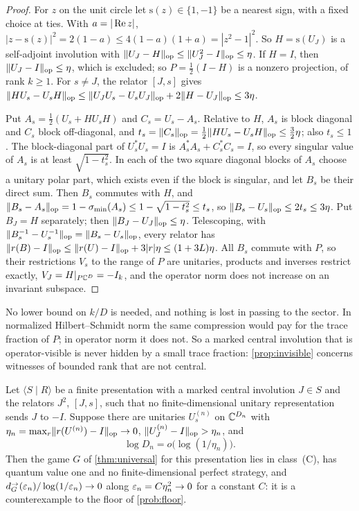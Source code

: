 \begin{proof}
For $z$ on the unit circle let $\mathrm s(z)\in\{1,-1\}$ be a nearest sign, with a fixed choice at ties. With $a=|\operatorname{Re} z|$,
$|z-\mathrm s(z)|^2=2(1-a)\le4(1-a)(1+a)=|z^2-1|^2$. So $H=\mathrm s(U_J)$ is a self-adjoint involution with
$\lVert U_J-H\rVert_{\mathrm{op}}\le\lVert U_J^2-I\rVert_{\mathrm{op}}\le\eta$. If $H=I$, then $\lVert U_J-I\rVert_{\mathrm{op}}\le\eta$, which is excluded; so $P=\frac12(I-H)$ is a nonzero
projection, of rank $k\ge1$. For $s\ne J$, the relator $[J,s]$ gives
$\lVert HU_s-U_sH\rVert_{\mathrm{op}}\le\lVert U_JU_s-U_sU_J\rVert_{\mathrm{op}}+2\lVert H-U_J\rVert_{\mathrm{op}}\le3\eta$.

Put $A_s=\frac12(U_s+HU_sH)$ and $C_s=U_s-A_s$. Relative to $H$, $A_s$ is block diagonal and $C_s$ block off-diagonal, and
$t_s=\lVert C_s\rVert_{\mathrm{op}}=\frac12\lVert HU_s-U_sH\rVert_{\mathrm{op}}\le\frac32\eta$; also $t_s\le1$. The block-diagonal part of $U_s^*U_s=I$ is
$A_s^*A_s+C_s^*C_s=I$, so every singular value of $A_s$ is at least $\sqrt{1-t_s^2}$. In each of the two square diagonal blocks of $A_s$
choose a unitary polar part, which exists even if the block is singular, and let $B_s$ be their direct sum. Then $B_s$ commutes
with $H$, and $\lVert B_s-A_s\rVert_{\mathrm{op}}=1-\sigma_{\min}(A_s)\le1-\sqrt{1-t_s^2}\le t_s$, so $\lVert B_s-U_s\rVert_{\mathrm{op}}\le2t_s\le3\eta$. Put $B_J=H$ separately; then
$\lVert B_J-U_J\rVert_{\mathrm{op}}\le\eta$. Telescoping, with $\lVert B_s^{-1}-U_s^{-1}\rVert_{\mathrm{op}}=\lVert B_s-U_s\rVert_{\mathrm{op}}$, every relator has
$\lVert r(B)-I\rVert_{\mathrm{op}}\le\lVert r(U)-I\rVert_{\mathrm{op}}+3|r|\eta\le(1+3L)\eta$. All $B_s$ commute with $P$, so their restrictions $V_s$ to the range of $P$ are
unitaries, products and inverses restrict exactly, $V_J=H|_{P\mathbb C^D}=-I_k$, and the operator norm does not increase on an invariant
subspace.
\end{proof}

No lower bound on $k/D$ is needed, and nothing is lost in passing to the sector. In normalized Hilbert--Schmidt norm the same
compression would pay for the trace fraction of $P$; in operator norm it does not. So a marked central involution that is
operator-visible is never hidden by a small trace fraction: \cref{prop:invisible} concerns witnesses of bounded rank that are not
central.

\begin{proposition}\label{prop:criterion}
Let $\langle S\mid R\rangle$ be a finite presentation with a marked central involution $J\in S$ and the relators $J^2$, $[J,s]$, such
that no finite-dimensional unitary representation sends $J$ to $-I$. Suppose there are unitaries $U^{(n)}_s$ on $\mathbb C^{D_n}$ with
$\eta_n=\max_r\lVert r(U^{(n)})-I\rVert_{\mathrm{op}}\to0$, $\lVert U^{(n)}_J-I\rVert_{\mathrm{op}}>\eta_n$, and
\[
\log D_n=o\bigl(\log(1/\eta_n)\bigr).
\]
Then the game $G$ of \cref{thm:universal} for this presentation lies in class~(C), has quantum value one and no finite-dimensional
perfect strategy, and $d^\to_G(\varepsilon_n)/\log(1/\varepsilon_n)\to0$ along $\varepsilon_n=C\eta_n^2\to0$ for a constant $C$: it is a counterexample
to the floor of \cref{prob:floor}.
\end{proposition}

